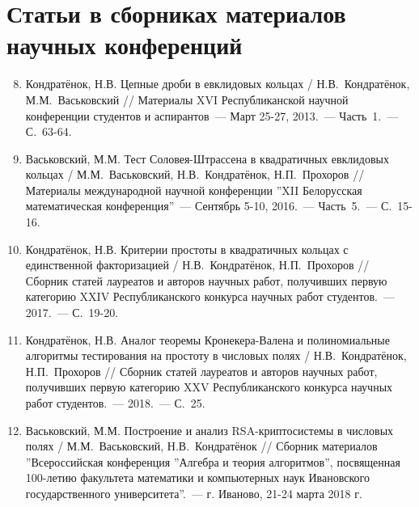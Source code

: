 \documentclass[_00_dissertation.tex]{subfiles}
\begin{document}
\vspace{-4ex}
\section*{\fontsize{14}{15}\selectfont Статьи в сборниках материалов научных конференций}
\vspace{-4ex}

\begin{enumerate}
\setcounter{enumi}{7}

    \item \label{source:Republican_Scientific_Conference_of_Students_and_Postgraduates_2013}
    Кондратёнок, Н.В. Цепные дроби в евклидовых кольцах / Н.В.~Кондратёнок, М.М.~Васьковский // Материалы XVI Республиканской научной конференции студентов и аспирантов~--- Март 25-27, 2013.~--- Часть~1.~--- С.~63-64.

    \item \label{source:XII_Belarussian_math_conference_2016}
    Васьковский, М.М. Тест Соловея-Штрассена в квадратичных евклидовых кольцах / М.М.~Васьковский, Н.В.~Кондратёнок, Н.П.~Прохоров // Материалы международной научной конференции ''XII Белорусская математическая конференция''~--- Сентябрь 5-10, 2016.~--- Часть~5.~--- С.~15-16.

    \item \label{source:Collection_of_articles_by_laureates_2017}
    Кондратёнок, Н.В. Критерии простоты в квадратичных кольцах с единственной факторизацией / Н.В.~Кондратёнок, Н.П.~Прохоров // Сборник статей лауреатов и авторов научных работ, получивших первую категорию XXIV Республиканского конкурса научных работ студентов.~--- 2017.~--- С.~19-20.

    \item \label{source:Collection_of_articles_by_laureates_2018}
    Кондратёнок, Н.В. Аналог теоремы Кронекера-Валена и полиномиальные алгоритмы тестирования на простоту в числовых полях / Н.В.~Кондратёнок, Н.П.~Прохоров // Сборник статей лауреатов и авторов научных работ, получивших первую категорию XXV Республиканского конкурса научных работ студентов.~--- 2018.~--- С.~25.

    \item \label{source:Algebra_and_theory_of_algorithms}
    Васьковский, М.М. Построение и анализ RSA-криптосистемы в числовых полях / М.М.~Васьковский, Н.В.~Кондратёнок // Сборник материалов ''Всероссийская конференция ''Алгебра и теория алгоритмов'', посвященная 100-летию факультета математики и компьютерных наук Ивановского государственного университета''.~--- г. Иваново, 21-24 марта 2018 г.


\end{enumerate}
\end{document}
